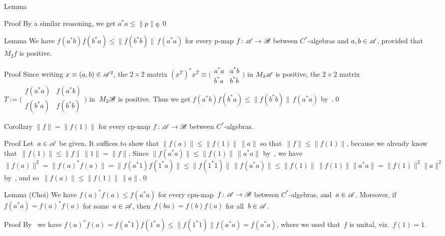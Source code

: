 \documentclass[a]{subfiles}
\begin{document}
\begin{parsec}
\begin{point}{Lemma}
\begin{point}{Proof}
By a similar reasoning, we get $a^*a\leq \|p\|q$.\qed
\end{point}
\end{point}
\begin{point}[cp-cs]{Lemma}%
We have $f(a^*b) f(b^*a)\leq \|f(b^*b)\|\,f(a^*a)$
for every p-map $f\colon \mathscr{A}\to\mathscr{B}$
between $C^*$-algebras
and $a,b\in\mathscr{A}$,
provided that $M_2f$ is positive.
\begin{point}{Proof}%
Since writing $x\equiv (a,b)\in \mathscr{A}^2$,
the $2\times 2$ matrix $(x^T)^* x^T\equiv 
	\bigl(
\begin{smallmatrix}
a^*a & a^*b \\
b^*a & b^* b
\end{smallmatrix} \bigr)$
in $M_2\mathscr{A}$
is positive,
the $2\times 2$ matrix $T:=\bigl(
\begin{smallmatrix}
	f(a^*a) & f(a^*b) \\
	f(b^*a) & f(b^* b)
\end{smallmatrix}\bigr)$
in~$M_2\mathscr{B}$ is positive.
Thus we get $f(a^*b) f(b^*a)\leq \|f(b^*b)\|\,f(a^*a)$
by~.\qed
\end{point}
\end{point}
\begin{point}{Corollary}%
$\|f\|= \|f(1)\|$
for every cp-map $f\colon \mathscr{A}\to\mathscr{B}$ between $C^*$-algebras.
\begin{point}{Proof}%
Let~$a\in\mathscr{A}$ be given.
It suffices to show that $\|f(a)\|\leq \|f(1)\|\,\|a\|$
so that~$\|f\|\leq\|f(1)\|$,
because we already know that~$\|f(1)\|\leq \|f\|\,\|1\| = \|f\|$.
Since $\|f(a^*a)\|\leq \|f(1)\|\,\|a^*a\|$
by~,
we have
 $\|f(a)\|^2=\|f(a)^*f(a)\|=\|f(a^*1)f(1^*a)\|
\leq \|f(1^*1)\|\,\|f(a^*a)\|
\leq \|f(1)\|\, \|f(1)\|\|a^*a\|
= \|f(1)\|^2 \|a\|^2$
by~,
and so~$\|f(a)\|\leq \|f(1)\|\,\|a\|$.\qed
\end{point}
\end{point}
\begin{point}[choi]{Lemma (Choi)}%
%
We have
$f(a)^*f(a) \leq f(a^* a)$ for
every
cpu-map~$f\colon \mathscr{A}\to\mathscr{B}$ between $C^*$-algebras,
and~$a\in\mathscr{A}$.
Moreover, if $f(a^*a)=f(a)^*f(a)$
for some~$a\in\mathscr{A}$,
then~$f(ba)=f(b)f(a)$
for all~$b\in \mathscr{A}$.
\begin{point}{Proof}%
By~
we have $f(a)^*f(a)=f(a^* 1)f(1^* a) \leq
\|f(1^*1)\| f(a^*a)=f(a^*a)$,
where we used that~$f$ is unital, viz.~$f(1)=1$.


\end{point}
\end{point}
\end{parsec}
\end{document}

